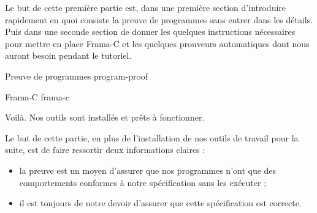 
Le but de cette première partie est, dans une première section d'introduire
rapidement en quoi consiste la preuve de programmes sans entrer dans les
détails. Puis dans une seconde section de donner les quelques instructions
nécessaires pour mettre en place Frama-C et les quelques prouveurs
automatiques dont nous auront besoin pendant le tutoriel.


\begin{levelTwo}
  {Preuve de programmes}
  {program-proof}
\end{levelTwo}


\begin{levelTwo}
  {Frama-C}
  {frama-c}
\end{levelTwo}


\horizontalLine

\newpage

Voilà. Nos outils sont installés et prêts à fonctionner.



Le but de cette partie, en plus de l'installation de nos outils de travail
pour la suite, est de faire ressortir deux informations claires :
\begin{itemize}
\item la preuve est un moyen d'assurer que nos programmes n'ont que des
comportements conformes à notre spécification sans les exécuter ;
\item il est toujours de notre devoir d'assurer que cette spécification est
correcte.
\end{itemize}
